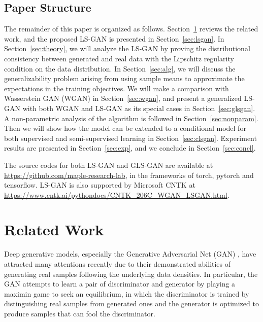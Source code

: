 \subsection{Paper Structure}
The remainder of this paper is organized as follows. Section~\ref{sec:related} reviews the related work, and the proposed LS-GAN is presented in Section~\ref{sec:lsgan}.  In Section~\ref{sec:theory}, we will analyze the LS-GAN by proving the distributional consistency between generated and real data with the Lipschitz regularity condition on the data distribution. In Section~\ref{sec:alg}, we will discuss the generalizability problem arising from using sample means to approximate the expectations in the training objectives. We will make a comparison with Wasserstein GAN (WGAN) in Section~\ref{sec:wgan}, and present a generalized LS-GAN with both WGAN and LS-GAN as its special cases in Section~\ref{sec:glsgan}. %
A non-parametric analysis of the algorithm is followed in Section~\ref{sec:nonparam}.
Then we will show how the model can be extended to a conditional model for both supervised and semi-supervised learning in Section~\ref{sec:clsgan}. Experiment results are presented in Section~\ref{sec:exp}, and we conclude in Section~\ref{sec:concl}.

 The source codes for both LS-GAN and GLS-GAN are available at \url{https://github.com/maple-research-lab}, in the frameworks of torch, pytorch and tensorflow. LS-GAN is also supported by Microsoft CNTK at \url{https://www.cntk.ai/pythondocs/CNTK_206C_WGAN_LSGAN.html}.





\section{Related Work}\label{sec:related}

Deep generative models, especially the Generative Adversarial Net (GAN) \cite{goodfellow2014generative}, have attracted many attentions recently due to their demonstrated abilities of generating real samples following the underlying data densities.  In particular, the GAN attempts to learn a pair of discriminator and generator by playing a maximin game to seek an equilibrium, in which the discriminator is trained by distinguishing real samples from generated ones and the generator is optimized to produce samples that can fool the discriminator.

